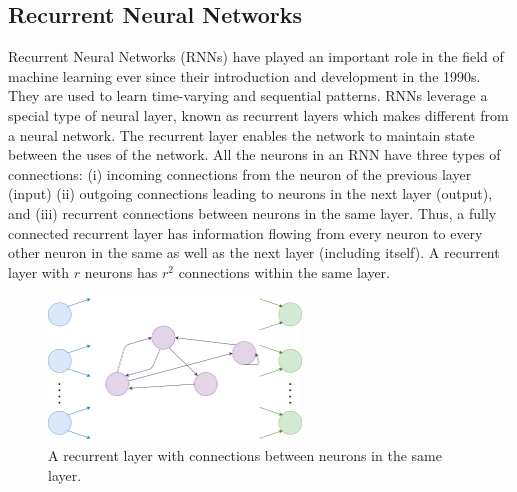 \subsection{Recurrent Neural Networks}
Recurrent Neural Networks (RNNs) have played an important role in the field of machine learning ever since their introduction and development in the 1990s. They are used to learn time-varying and sequential patterns. \cite{medsker2001recurrent} RNNs leverage a special type of neural layer, known as recurrent layers which makes different from a neural network. The recurrent layer enables the network to maintain state between the uses of the network. All the neurons in an RNN have three types of connections: (i) incoming connections from the neuron of the previous layer (input) (ii) outgoing connections leading to neurons in the next layer (output), and (iii) recurrent connections between neurons in the same layer. Thus, a fully connected recurrent layer has information flowing from every neuron to every other neuron in the same as well as the next layer (including itself). A recurrent layer with $r$ neurons has $r^2$ connections within the same layer.
\begin{figure}[!h]
	\centering
	\includegraphics[width=0.6\textwidth]{Pictures/rnn-layer.png}
	\hspace{1mm}
	\caption{A recurrent layer with connections between neurons in the same layer. } 
	\label{fig:err-surf}
\end{figure}

